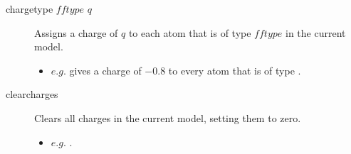 \begin{description}
	\item[chargetype $fftype$ $q$\its] Assigns a charge of $q$ to each atom that is of type $fftype$ in the current model.
	\begin{itemize}
		\item $e.g.$  gives a charge of $-0.8$ to every atom that is of type .
	\end{itemize}

	\item[clearcharges\its] Clears all charges in the current model, setting them to zero.
	\begin{itemize}
		\item $e.g.$ .
	\end{itemize}

\end{description}



